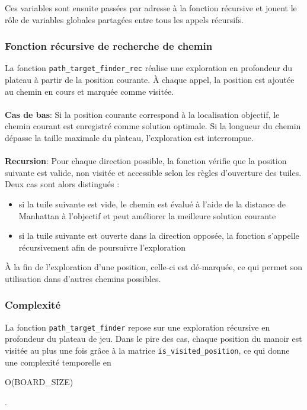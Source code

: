 Ces variables sont ensuite passées par adresse à la fonction récursive et jouent le rôle de variables globales partagées entre tous les appels récursifs.

\subsubsection{Fonction récursive de recherche de chemin}

La fonction \texttt{path\_target\_finder\_rec} réalise une exploration en profondeur du plateau à partir de la position courante. À chaque appel, la position est ajoutée au chemin en cours et marquée comme visitée.\\
\\
\textbf{Cas de bas}:
Si la position courante correspond à la localisation objectif, le chemin courant est enregistré comme solution optimale. Si la longueur du chemin dépasse la taille maximale du plateau, l’exploration est interrompue. \\
\\
\textbf{Recursion}:
Pour chaque direction possible, la fonction vérifie que la position suivante est valide, non visitée et accessible selon les règles d’ouverture des tuiles. Deux cas sont alors distingués :
\begin{itemize}
  \item si la tuile suivante est vide, le chemin est évalué à l’aide de la distance de Manhattan à l’objectif et peut améliorer la meilleure solution courante
  \item si la tuile suivante est ouverte dans la direction opposée, la fonction s’appelle récursivement afin de poursuivre l’exploration
\end{itemize}

À la fin de l’exploration d’une position, celle-ci est dé-marquée, ce qui permet son utilisation dans d’autres chemins possibles.

\subsubsection{Complexité}

La fonction \texttt{path\_target\_finder} repose sur une exploration récursive en profondeur du plateau de jeu. Dans le pire des cas, chaque position du manoir est visitée au plus une fois grâce à la matrice \texttt{is\_visited\_position}, ce qui donne une complexité temporelle en \begin{scriptsize}O(BOARD\_SIZE)\end{scriptsize}.

